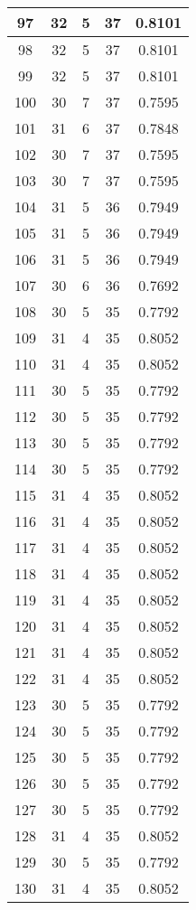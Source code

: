 \documentclass[letterpaper, 12pt]{article}
\begin{document}
\begin{longtable}{|c|c|c|c|c|}
\hline
97 & 32 & 5 & 37 & 0.8101 \\
\hline
98 & 32 & 5 & 37 & 0.8101 \\
\hline
99 & 32 & 5 & 37 & 0.8101 \\
\hline
100 & 30 & 7 & 37 & 0.7595 \\
\hline
101 & 31 & 6 & 37 & 0.7848 \\
\hline
102 & 30 & 7 & 37 & 0.7595 \\
\hline
103 & 30 & 7 & 37 & 0.7595 \\
\hline
104 & 31 & 5 & 36 & 0.7949 \\
\hline
105 & 31 & 5 & 36 & 0.7949 \\
\hline
106 & 31 & 5 & 36 & 0.7949 \\
\hline
107 & 30 & 6 & 36 & 0.7692 \\
\hline
108 & 30 & 5 & 35 & 0.7792 \\
\hline
109 & 31 & 4 & 35 & 0.8052 \\
\hline
110 & 31 & 4 & 35 & 0.8052 \\
\hline
111 & 30 & 5 & 35 & 0.7792 \\
\hline
112 & 30 & 5 & 35 & 0.7792 \\
\hline
113 & 30 & 5 & 35 & 0.7792 \\
\hline
114 & 30 & 5 & 35 & 0.7792 \\
\hline
115 & 31 & 4 & 35 & 0.8052 \\
\hline
116 & 31 & 4 & 35 & 0.8052 \\
\hline
117 & 31 & 4 & 35 & 0.8052 \\
\hline
118 & 31 & 4 & 35 & 0.8052 \\
\hline
119 & 31 & 4 & 35 & 0.8052 \\
\hline
120 & 31 & 4 & 35 & 0.8052 \\
\hline
121 & 31 & 4 & 35 & 0.8052 \\
\hline
122 & 31 & 4 & 35 & 0.8052 \\
\hline
123 & 30 & 5 & 35 & 0.7792 \\
\hline
124 & 30 & 5 & 35 & 0.7792 \\
\hline
125 & 30 & 5 & 35 & 0.7792 \\
\hline
126 & 30 & 5 & 35 & 0.7792 \\
\hline
127 & 30 & 5 & 35 & 0.7792 \\
\hline
128 & 31 & 4 & 35 & 0.8052 \\
\hline
129 & 30 & 5 & 35 & 0.7792 \\
\hline
130 & 31 & 4 & 35 & 0.8052 \\

\end{longtable}
\end{document}
